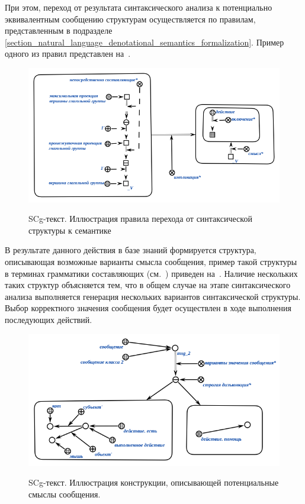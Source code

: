 При этом, переход от результата синтаксического анализа к потенциально эквивалентным сообщению структурам осуществляется по правилам, представленным в подразделе \ref{section_natural_language_denotational_semantics_formalization}.
Пример одного из правил представлен на~\textit{}.

\begin{figure}[h]
    \caption{SCg-текст. Иллюстрация правила перехода от синтаксической структуры к семантике}
    \includegraphics[scale=0.8]{images/part4/chapter_nl_interfaces/d_sem_3}    
    \label{fig:transition_to_semanic_rule}
\end{figure}

В результате данного действия в базе знаний формируется структура, описывающая возможные варианты смысла сообщения, пример такой структуры в терминах грамматики составляющих (см.~) приведен на~\textit{}.
Наличие нескольких таких структур объясняется тем, что в общем случае на этапе синтаксического анализа выполняется генерация нескольких вариантов синтаксической структуры.
Выбор корректного значения сообщения будет осуществлен в ходе выполнения последующих действий.

\begin{figure}[H]
    \caption{SCg-текст. Иллюстрация конструкции, описывающей потенциальные смыслы сообщения.}
    \includegraphics[scale=0.8]{images/part4/chapter_nl_interfaces/messsage_meaning_variants}
    \label{fig:messsage_meaning_variants}
\end{figure}

